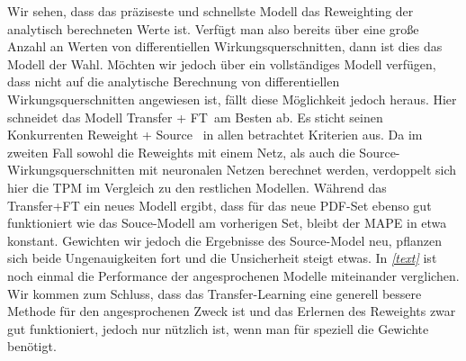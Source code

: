 Wir sehen, dass das präziseste und schnellste Modell das Reweighting der analytisch berechneten Werte ist. Verfügt man also bereits über eine große Anzahl an Werten von differentiellen Wirkungsquerschnitten, dann ist dies das Modell der Wahl. Möchten wir jedoch über ein vollständiges Modell verfügen, dass nicht auf die analytische Berechnung von differentiellen Wirkungsquerschnitten angewiesen ist, fällt diese Möglichkeit jedoch heraus. Hier schneidet das Modell \glqq Transfer + FT\grqq~am Besten ab. Es sticht seinen Konkurrenten \glqq Reweight + Source\grqq~ in allen betrachtet Kriterien aus. Da im zweiten Fall sowohl die Reweights mit einem Netz, als auch die Source-Wirkungsquerschnitten mit neuronalen Netzen berechnet werden, verdoppelt sich hier die TPM im Vergleich zu den restlichen Modellen. Während das Transfer+FT ein neues Modell ergibt, dass für das neue PDF-Set ebenso gut funktioniert wie das Souce-Modell am vorherigen Set, bleibt der MAPE in etwa konstant. Gewichten wir jedoch die Ergebnisse des Source-Model neu, pflanzen sich beide Ungenauigkeiten fort und die Unsicherheit steigt etwas. In \textit{\autoref{text}} ist noch einmal die Performance der angesprochenen Modelle miteinander verglichen.\\
\newline
Wir kommen zum Schluss, dass das Transfer-Learning eine generell bessere Methode für den angesprochenen Zweck ist und das Erlernen des Reweights zwar gut funktioniert, jedoch nur nützlich ist, wenn man für speziell die Gewichte benötigt.
